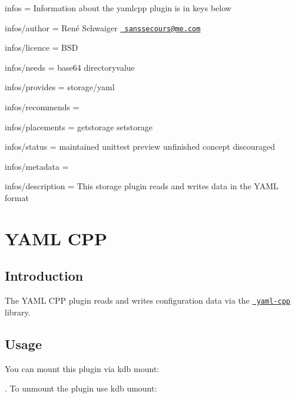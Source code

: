 
\begin{DoxyItemize}
\item infos = Information about the yamlcpp plugin is in keys below
\item infos/author = René Schwaiger \href{mailto:sanssecours@me.com}{\texttt{ sanssecours@me.\+com}}
\item infos/licence = B\+SD
\item infos/needs = base64 directoryvalue
\item infos/provides = storage/yaml
\item infos/recommends =
\item infos/placements = getstorage setstorage
\item infos/status = maintained unittest preview unfinished concept discouraged
\item infos/metadata =
\item infos/description = This storage plugin reads and writes data in the Y\+A\+ML format
\end{DoxyItemize}\hypertarget{autotoc_md780_src_plugins_yamlcpp_README_md}{}\section{Y\+A\+M\+L C\+PP}\label{autotoc_md780_src_plugins_yamlcpp_README_md}
\hypertarget{autotoc_md780_autotoc_md781}{}\subsection{Introduction}\label{autotoc_md780_autotoc_md781}
The Y\+A\+ML C\+PP plugin reads and writes configuration data via the \href{https://github.com/jbeder/yaml-cpp}{\texttt{ yaml-\/cpp}} library.\hypertarget{autotoc_md780_autotoc_md782}{}\subsection{Usage}\label{autotoc_md780_autotoc_md782}
You can mount this plugin via {\ttfamily kdb mount}\+:


\begin{DoxyCode}{0}
\end{DoxyCode}


. To unmount the plugin use {\ttfamily kdb umount}\+:


\begin{DoxyCode}{0}
\end{DoxyCode}


